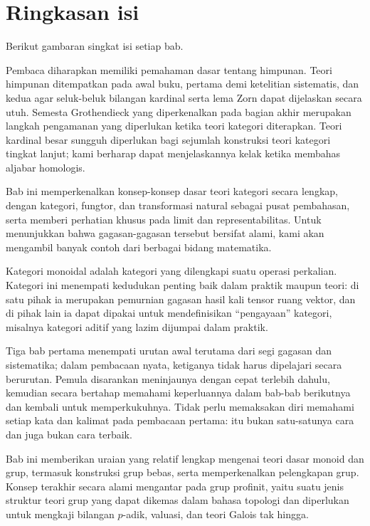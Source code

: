 \section*{Ringkasan isi}
Berikut gambaran singkat isi setiap bab.

\begin{asparadesc}
	\item[Bab 1: Teori himpunan] Pembaca diharapkan memiliki pemahaman dasar tentang himpunan. Teori himpunan ditempatkan pada awal buku, pertama demi ketelitian sistematis, dan kedua agar seluk-beluk bilangan kardinal serta lema Zorn dapat dijelaskan secara utuh. Semesta Grothendieck yang diperkenalkan pada bagian akhir merupakan langkah pengamanan yang diperlukan ketika teori kategori diterapkan. Teori kardinal besar sungguh diperlukan bagi sejumlah konstruksi teori kategori tingkat lanjut; kami berharap dapat menjelaskannya kelak ketika membahas aljabar homologis.
	
	\item[Bab 2: Dasar-dasar teori kategori] Bab ini memperkenalkan konsep-konsep dasar teori kategori secara lengkap, dengan kategori, fungtor, dan transformasi natural sebagai pusat pembahasan, serta memberi perhatian khusus pada limit dan representabilitas. Untuk menunjukkan bahwa gagasan-gagasan tersebut bersifat alami, kami akan mengambil banyak contoh dari berbagai bidang matematika.
	
	\item[Bab 3: Kategori monoidal] Kategori monoidal adalah kategori yang dilengkapi suatu operasi perkalian. Kategori ini menempati kedudukan penting baik dalam praktik maupun teori: di satu pihak ia merupakan pemurnian gagasan hasil kali tensor ruang vektor, dan di pihak lain ia dapat dipakai untuk mendefinisikan ``pengayaan'' kategori, misalnya kategori aditif yang lazim dijumpai dalam praktik.

	Tiga bab pertama menempati urutan awal terutama dari segi gagasan dan sistematika; dalam pembacaan nyata, ketiganya tidak harus dipelajari secara berurutan. Pemula disarankan meninjaunya dengan cepat terlebih dahulu, kemudian secara bertahap memahami keperluannya dalam bab-bab berikutnya dan kembali untuk memperkukuhnya. Tidak perlu memaksakan diri memahami setiap kata dan kalimat pada pembacaan pertama: itu bukan satu-satunya cara dan juga bukan cara terbaik.

	\item[Bab 4: Teori grup] Bab ini memberikan uraian yang relatif lengkap mengenai teori dasar monoid dan grup, termasuk konstruksi grup bebas, serta memperkenalkan pelengkapan grup. Konsep terakhir secara alami mengantar pada grup profinit, yaitu suatu jenis struktur teori grup yang dapat dikemas dalam bahasa topologi dan diperlukan untuk mengkaji bilangan $p$-adik, valuasi, dan teori Galois tak hingga.
	

\end{asparadesc}
